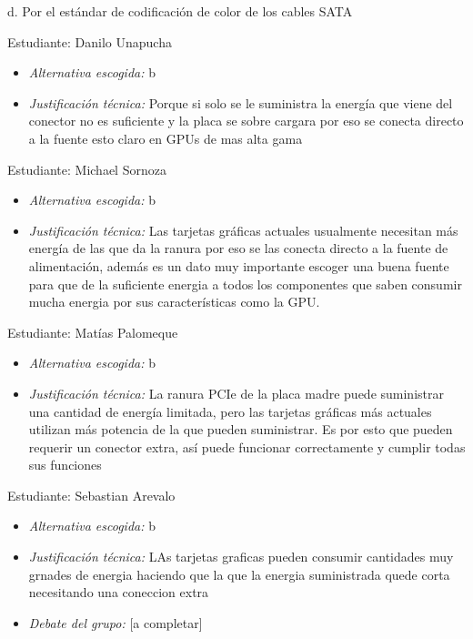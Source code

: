 \documentclass{article}
\begin{document}
d. Por el estándar de codificación de color de los cables SATA

Estudiante: Danilo Unapucha

\begin{itemize}
\item \emph{Alternativa escogida:} b
\item \emph{Justificación técnica:} Porque si solo se le suministra la energía
que viene del conector no es suficiente y la placa se sobre cargara
por eso se conecta directo a la fuente esto claro en GPUs de mas
alta gama
\end{itemize}

Estudiante: Michael Sornoza

\begin{itemize}
\item \emph{Alternativa escogida:} b
\item \emph{Justificación técnica:} Las tarjetas gráficas actuales usualmente necesitan más energía de las que
da la ranura por eso se las conecta directo a la fuente de alimentación, además es un dato muy importante
escoger una buena fuente para que de la suficiente energia a todos los componentes que saben consumir
mucha energia por sus características como la GPU.
\end{itemize}

Estudiante: Matías Palomeque

\begin{itemize}
\item \emph{Alternativa escogida:} b
\item \emph{Justificación técnica:} La ranura PCIe de la placa madre puede
suministrar una cantidad de energía limitada, pero las tarjetas
gráficas más actuales utilizan más potencia de la que pueden
suministrar. Es por esto que pueden requerir un conector extra, así
puede funcionar correctamente y cumplir todas sus funciones
\end{itemize}

Estudiante: Sebastian Arevalo

\begin{itemize}
\item \emph{Alternativa escogida:} b
\item \emph{Justificación técnica:} LAs tarjetas graficas pueden consumir
cantidades muy grnades de energia haciendo que la que la energia
suministrada quede corta necesitando una coneccion extra

\item \emph{Debate del grupo:} [a completar]
\end{itemize}
\end{document}

